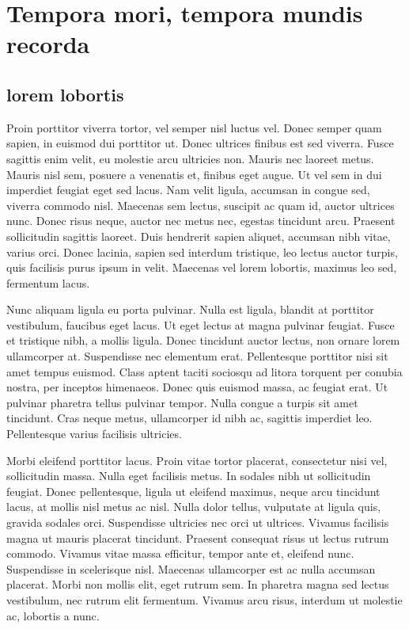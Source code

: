\chapter{Tempora mori, tempora mundis recorda}

\section{lorem lobortis}
Proin porttitor viverra tortor, vel semper nisl luctus vel. 
Donec semper quam sapien, in euismod dui porttitor ut. 
Donec ultrices finibus est sed viverra. 
Fusce sagittis enim velit, eu molestie arcu ultricies non. 
Mauris nec laoreet metus. 
Mauris nisl sem, posuere a venenatis et, finibus eget augue. 
Ut vel sem in dui imperdiet feugiat eget sed lacus. 
Nam velit ligula, accumsan in congue sed, viverra commodo nisl. 
Maecenas sem lectus, suscipit ac quam id, auctor ultrices nunc. 
Donec risus neque, auctor nec metus nec, egestas tincidunt arcu. 
Praesent sollicitudin sagittis laoreet. 
Duis hendrerit sapien aliquet, accumsan nibh vitae, varius orci. 
Donec lacinia, sapien sed interdum tristique, leo lectus auctor turpis, quis facilisis purus ipsum in velit. 
Maecenas vel lorem lobortis, maximus leo sed, fermentum lacus.

Nunc aliquam ligula eu porta pulvinar. 
Nulla est ligula, blandit at porttitor vestibulum, faucibus eget lacus. 
Ut eget lectus at magna pulvinar feugiat. 
Fusce et tristique nibh, a mollis ligula. 
Donec tincidunt auctor lectus, non ornare lorem ullamcorper at. 
Suspendisse nec elementum erat. 
Pellentesque porttitor nisi sit amet tempus euismod. 
Class aptent taciti sociosqu ad litora torquent per conubia nostra, per inceptos himenaeos. 
Donec quis euismod massa, ac feugiat erat. 
Ut pulvinar pharetra tellus pulvinar tempor. 
Nulla congue a turpis sit amet tincidunt. 
Cras neque metus, ullamcorper id nibh ac, sagittis imperdiet leo. 
Pellentesque varius facilisis ultricies.

Morbi eleifend porttitor lacus. 
Proin vitae tortor placerat, consectetur nisi vel, sollicitudin massa. 
Nulla eget facilisis metus. 
In sodales nibh ut sollicitudin feugiat. 
Donec pellentesque, ligula ut eleifend maximus, neque arcu tincidunt lacus, at mollis nisl metus ac nisl. 
Nulla dolor tellus, vulputate at ligula quis, gravida sodales orci. 
Suspendisse ultricies nec orci ut ultrices. 
Vivamus facilisis magna ut mauris placerat tincidunt. 
Praesent consequat risus ut lectus rutrum commodo. 
Vivamus vitae massa efficitur, tempor ante et, eleifend nunc. 
Suspendisse in scelerisque nisl. 
Maecenas ullamcorper est ac nulla accumsan placerat. 
Morbi non mollis elit, eget rutrum sem. 
In pharetra magna sed lectus vestibulum, nec rutrum elit fermentum. 
Vivamus arcu risus, interdum ut molestie ac, lobortis a nunc.

